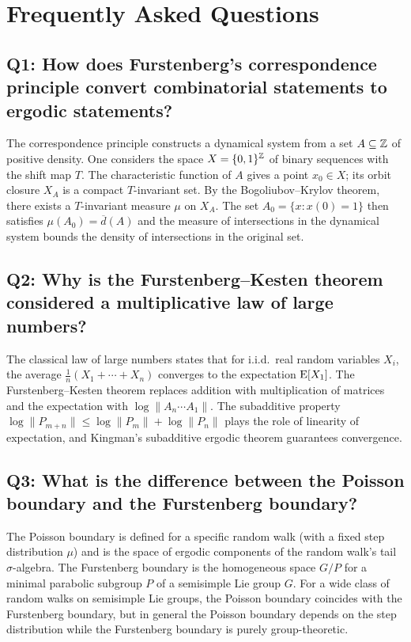 \section{Frequently Asked Questions}

\subsection*{Q1: How does Furstenberg's correspondence principle convert combinatorial statements to ergodic statements?}

The correspondence principle constructs a dynamical system from a set \(A \subseteq \mathbb{Z}\) of positive density. One considers the space \(X = \{0,1\}^{\mathbb{Z}}\) of binary sequences with the shift map \(T\). The characteristic function of \(A\) gives a point \(x_0 \in X\); its orbit closure \(X_A\) is a compact \(T\)-invariant set. By the Bogoliubov--Krylov theorem, there exists a \(T\)-invariant measure \(\mu\) on \(X_A\). The set \(A_0 = \{x : x(0) = 1\}\) then satisfies \(\mu(A_0) = \overline{d}(A)\) and the measure of intersections in the dynamical system bounds the density of intersections in the original set.

\subsection*{Q2: Why is the Furstenberg--Kesten theorem considered a multiplicative law of large numbers?}

The classical law of large numbers states that for i.i.d.\ real random variables \(X_i\), the average \(\frac{1}{n}(X_1 + \cdots + X_n)\) converges to the expectation \(\operatorname{E}[X_1]\). The Furstenberg--Kesten theorem replaces addition with multiplication of matrices and the expectation with \(\log\|A_n \cdots A_1\|\). The subadditive property \(\log\|P_{m+n}\| \leq \log\|P_m\| + \log\|P_n\|\) plays the role of linearity of expectation, and Kingman's subadditive ergodic theorem guarantees convergence.

\subsection*{Q3: What is the difference between the Poisson boundary and the Furstenberg boundary?}

The Poisson boundary is defined for a specific random walk (with a fixed step distribution \(\mu\)) and is the space of ergodic components of the random walk's tail \(\sigma\)-algebra. The Furstenberg boundary is the homogeneous space \(G/P\) for a minimal parabolic subgroup \(P\) of a semisimple Lie group \(G\). For a wide class of random walks on semisimple Lie groups, the Poisson boundary coincides with the Furstenberg boundary, but in general the Poisson boundary depends on the step distribution while the Furstenberg boundary is purely group-theoretic.

